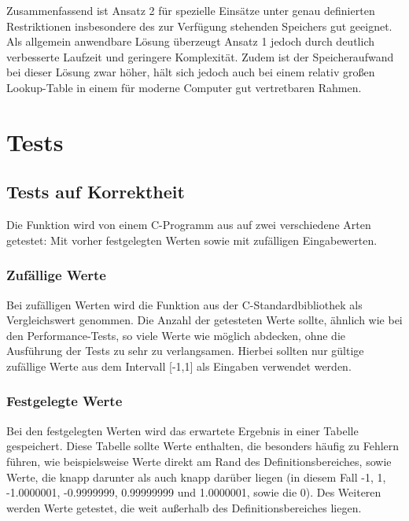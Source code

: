 \documentclass{article}
\begin{document}
		Zusammenfassend ist Ansatz 2 für spezielle Einsätze unter genau definierten Restriktionen insbesondere des zur Verfügung stehenden Speichers gut geeignet. Als allgemein anwendbare Lösung überzeugt Ansatz 1 jedoch durch deutlich verbesserte Laufzeit und geringere Komplexität. Zudem ist der Speicheraufwand bei dieser Lösung zwar höher, hält sich jedoch auch bei einem relativ großen Lookup-Table in einem für moderne Computer gut vertretbaren Rahmen.\\

\iffalse
Befürchtung: Performance-Probleme. Feststellung der Präzision ist kompliziert, bzw. schwer einzuschätzen.\\
Frage: Wie legt man die Reihenlänge fest?\\
Berechnung der Reihe laut Aufgabenstellung:\\
TODO: Son FPU-Rumgefummle...
Mathematische Formel schreiben
Begründung: Speichernutzung ist billiger als Performance.
\fi

\section{Tests}
\label{sec:Tests}

	\subsection{Tests auf Korrektheit}
	Die Funktion wird von einem C-Programm aus auf zwei verschiedene Arten getestet: Mit vorher festgelegten Werten sowie mit zufälligen Eingabewerten.

	\subsubsection{Zufällige Werte}
	Bei zufälligen Werten wird die Funktion  aus der C-Standardbibliothek als Vergleichswert genommen. Die Anzahl der getesteten Werte sollte, ähnlich wie bei den Performance-Tests, so viele Werte wie möglich abdecken, ohne die Ausführung der Tests zu sehr zu verlangsamen. Hierbei sollten nur gültige zufällige Werte aus dem Intervall [-1,1] als Eingaben verwendet werden.

	\subsubsection{Festgelegte Werte}
	Bei den festgelegten Werten wird das erwartete Ergebnis in einer Tabelle gespeichert. Diese Tabelle sollte Werte enthalten, die besonders häufig zu Fehlern führen, wie beispielsweise Werte direkt am Rand des Definitionsbereiches, sowie Werte, die knapp darunter als auch knapp darüber liegen (in diesem Fall -1, 1, -1.0000001, -0.9999999, 0.99999999 und 1.0000001, sowie die 0). Des Weiteren werden  Werte getestet, die weit außerhalb des Definitionsbereiches liegen.
\end{document}

